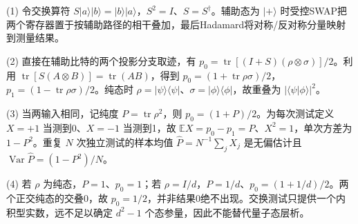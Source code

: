 (1) 令交换算符 \(S|a\rangle|b\rangle=|b\rangle|a\rangle\)，\(S^2=I\)、\(S=S^\dagger\)。辅助态为 \(|+\rangle\) 时受控SWAP把两个寄存器置于按辅助路径的相干叠加，最后Hadamard将对称/反对称分量映射到测量结果。

(2) 直接在辅助比特的两个投影分支取迹，有 \(p_0=\operatorname{tr}[(I+S)(\rho\otimes\sigma)]/2\)。利用 \(\operatorname{tr}[S(A\otimes B)]=\operatorname{tr}(AB)\)，得到 \(\boxed{p_0=(1+\operatorname{tr}\rho\sigma)/2}\)，\(p_1=(1-\operatorname{tr}\rho\sigma)/2\)。纯态时 \(\rho=|\psi\rangle\langle\psi|\)、\(\sigma=|\phi\rangle\langle\phi|\)，故重叠为 \(|\langle\psi|\phi\rangle|^2\)。

(3) 当两输入相同，记纯度 \(P=\operatorname{tr}\rho^2\)，则 \(p_0=(1+P)/2\)。为每次测试定义 \(X=+1\) 当测到0、\(X=-1\) 当测到1，故 \(\mathbb EX=p_0-p_1=P\)、\(X^2=1\)，单次方差为 \(1-P^2\)。重复 \(N\) 次独立测试的样本均值 \(\widehat P=N^{-1}\sum_jX_j\) 是无偏估计且 \(\boxed{\operatorname{Var}\widehat P=(1-P^2)/N}\)。

(4) 若 \(\rho\) 为纯态，\(P=1\)、\(p_0=1\)；若 \(\rho=I/d\)，\(P=1/d\)、\(p_0=(1+1/d)/2\)。两个正交纯态的交叠0，故 \(p_0=1/2\)，并非结果0绝不出现。交换测试只提供一个内积型实数，远不足以确定 \(d^2-1\) 个态参量，因此不能替代量子态层析。

